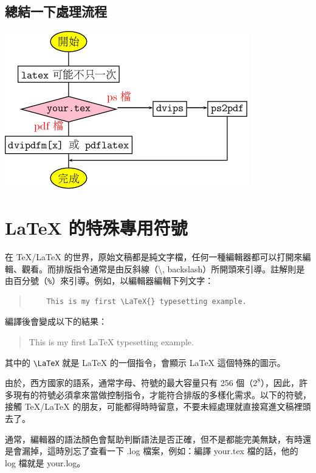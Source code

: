 \subsection{總結一下處理流程}

\begin{center}
   \includegraphics{latex-flow}
\end{center}

\section{\LaTeX{} 的特殊專用符號}

在 \TeX{}/\LaTeX{} 的世界，原始文稿都是純文字檔，任何一種編輯器都可以打開來編輯、觀看。而排版指令通常是由反斜線（\textbackslash, backslash）所開頭來引導。註解則是由百分號（\texttt{\%}）來引導。例如，以編輯器編輯下列文字：

\begin{quote}
   \begin{verbatim}
    This is my first \LaTeX{} typesetting example.
  \end{verbatim}
\end{quote}

編譯後會變成以下的結果：

\begin{quote}
   This is my first \LaTeX{} typesetting example.
\end{quote}

其中的 \verb|\LaTeX| 就是 \LaTeX{} 的一個指令，會顯示 \LaTeX{} 這個特殊的圖示。

由於，西方國家的語系，通常字母、符號的最大容量只有 256 個（$2^8$），因此，許多現有的符號必須拿來當做控制指令，才能符合排版的多樣化需求。以下的符號，接觸 \TeX{}/\LaTeX{} 的朋友，可能都得時時留意，不要未經處理就直接寫進文稿裡頭去了。

通常，編輯器的語法顏色會幫助判斷語法是否正確，但不是都能完美無缺，有時還是會漏掉，這時別忘了查看一下 {\ttfamily *.log} 檔案，例如：編譯 {\ttfamily your.tex} 檔的話，他的 log 檔就是 {\ttfamily your.log}。

